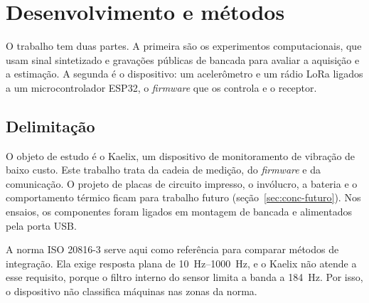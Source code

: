 
\makeatletter
{}
\makeatother

\chapter{Desenvolvimento e métodos}
\label{cap:desenvolvimento}

O trabalho tem duas partes. A primeira são os experimentos computacionais, que usam sinal
sintetizado e gravações públicas de bancada para avaliar a aquisição e a estimação. A
segunda é o dispositivo: um acelerômetro e um rádio LoRa ligados a um microcontrolador
ESP32, o \emph{firmware} que os controla e o receptor.

\section{Delimitação}
\label{sec:dev-delimitacao}

O objeto de estudo é o Kaelix, um dispositivo de monitoramento de vibração de baixo custo.
Este trabalho trata da cadeia de medição, do \emph{firmware} e da comunicação. O projeto de
placas de circuito impresso, o invólucro, a bateria e o comportamento térmico ficam para
trabalho futuro (seção~\ref{sec:conc-futuro}). Nos ensaios, os componentes foram ligados
em montagem de bancada e alimentados pela porta USB.

A norma ISO 20816-3 serve aqui como referência para comparar métodos de integração. Ela
exige resposta plana de \SIrange{10}{1000}{\hertz}, e o Kaelix não atende a esse requisito,
porque o filtro interno do sensor limita a banda a \SI{184}{\hertz}. Por isso, o
dispositivo não classifica máquinas nas zonas da norma.

